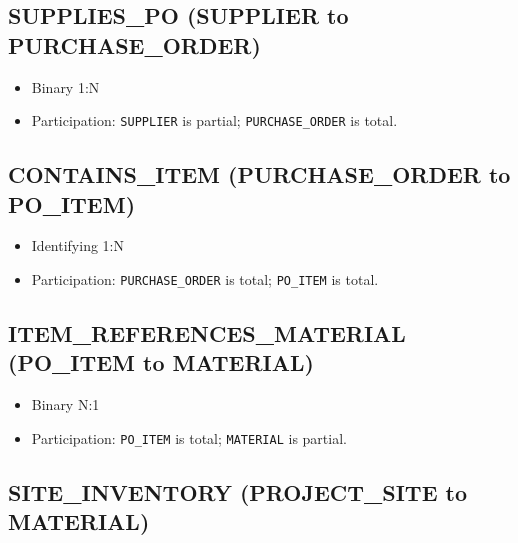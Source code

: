 \documentclass[a4paper,12pt]{report}
\providecommand{\tightlist}{%
  \setlength{\itemsep}{0pt}\setlength{\parskip}{0pt}}
\begin{document}
\subsection{\texorpdfstring{SUPPLIES\texorpdfstring{\_\allowbreak{}}{_}PO (SUPPLIER to PURCHASE\texorpdfstring{\_\allowbreak{}}{_}ORDER)}{SUPPLIESPO (SUPPLIER to PURCHASEORDER)}}\label{supplies_po-supplier-to-purchase_order}

\begin{itemize}
\tightlist
\item
  Binary 1:N
\item
  Participation: \texttt{SUPPLIER} is partial; \texttt{PURCHASE\_\allowbreak{}ORDER} is total.
\end{itemize}

\subsection{\texorpdfstring{CONTAINS\texorpdfstring{\_\allowbreak{}}{_}ITEM (PURCHASE\texorpdfstring{\_\allowbreak{}}{_}ORDER to PO\texorpdfstring{\_\allowbreak{}}{_}ITEM)}{CONTAINSITEM (PURCHASEORDER to POITEM)}}\label{contains_item-purchase_order-to-po_item}

\begin{itemize}
\tightlist
\item
  Identifying 1:N
\item
  Participation: \texttt{PURCHASE\_\allowbreak{}ORDER} is total; \texttt{PO\_\allowbreak{}ITEM} is total.
\end{itemize}

\subsection{\texorpdfstring{ITEM\texorpdfstring{\_\allowbreak{}}{_}REFERENCES\texorpdfstring{\_\allowbreak{}}{_}MATERIAL (PO\texorpdfstring{\_\allowbreak{}}{_}ITEM to MATERIAL)}{ITEMREFERENCESMATERIAL (POITEM to MATERIAL)}}\label{item_references_material-po_item-to-material}

\begin{itemize}
\tightlist
\item
  Binary N:1
\item
  Participation: \texttt{PO\_\allowbreak{}ITEM} is total; \texttt{MATERIAL} is partial.
\end{itemize}

\subsection{\texorpdfstring{SITE\texorpdfstring{\_\allowbreak{}}{_}INVENTORY (PROJECT\texorpdfstring{\_\allowbreak{}}{_}SITE to MATERIAL)}{SITEINVENTORY (PROJECTSITE to MATERIAL)}}\label{site_inventory-project_site-to-material}
\end{document}
